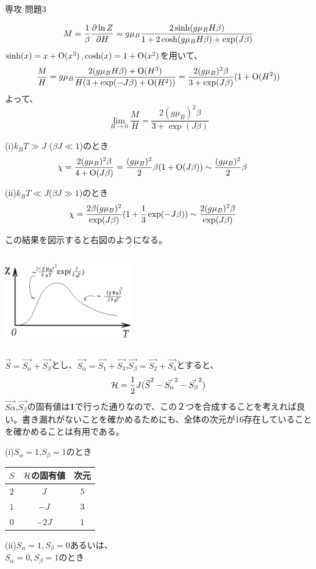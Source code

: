 \documentclass[fleqn]{jbook}
\begin{document}
\begin{answer}{専攻 問題3}{}
\begin{subanswers}
\SubAnswer
\[ M=\frac{1}{\beta}{\frac{\partial \ln Z}{\partial H}}=g\mu_B \frac{2\sinh(g\mu_B H \beta)}{1+2\cosh(g\mu_B H \beta)+\exp(J\beta)} \]
$\sinh(x)=x+{\rm{O}}(x^3)$\quad ,\quad $\cosh(x)=1+{\rm{O}}(x^2)$を用いて、
\[ \frac{M}{H}=g\mu_B \frac{2(g\mu_B H \beta)+{\rm{O}}(H^3)}{H(3+\exp(-J\beta)+{\rm{O}}(H^2))}= \frac{2 (g\mu_B)^2 \beta }{3+\exp(J\beta)}(1+{\rm{O}}(H^2)) \]
よって、
\[ \lim_{H\rightarrow 0} \frac{M}{H}= \frac{2(g\mu_B)^2 \beta }{3+\exp(J\beta)} \]
\parbox[t]{90mm}{(i)$k_B T \gg J$ ($\beta J \ll 1$)のとき
\[\hspace{-5mm} \chi=\frac{2(g\mu_B)^2 \beta}{4+{\rm{O}}(J\beta)}= \frac{(g\mu_B)^2}{2}\beta (1+{\rm{O}}(J\beta)) \sim \frac{(g\mu_B)^2}{2}\beta \]

(ii)$k_B T \ll J $($\beta J \gg 1$)のとき
\[\hspace{-5mm} \chi = \frac{2\beta(g\mu_B)^2}{\exp(J\beta)}(1+\frac{1}{3}\exp(-J\beta)) \sim \frac{2(g\mu_B)^2 \beta}{\exp(J\beta)} \]

この結果を図示すると右図のようになる。
}\parbox[t]{70mm}{\vspace*{-7mm}
\begin{center}
\includegraphics[clip,height=40mm,width=55mm]{1997phy3-3.eps}
\end{center}
}

\SubAnswer
$\vec{S}=\vec{S_\alpha}+\vec{S_\beta}$とし、$\vec{S_\alpha}=\vec{S_1}+\vec{S_3}$\quad ,\quad $\vec{S_\beta}=\vec{S_2}+\vec{S_4}$とすると、
\[ {\cal{H}}=\frac{1}{2}J (\vec{S_{ }}^2 -\vec{S_\alpha}^2-\vec{S_\beta}^2 ) \]
$\vec{S\alpha}$,$\vec{S_\beta}$の固有値は{\bf{1}}で行った通りなので、この２つを合成することを考えれば良い。書き漏れがないことを確かめるためにも、全体の次元が16存在していることを確かめることは有用である。

\parbox[t]{50mm}{
(i)$S_\alpha=1$,$S_\beta=1$のとき

\begin{tabular}{|c|c|c|}\hline
$S$ & $\cal{H}$の固有値 & 次元 \\ \hline\hline
$2$ & $J$                 & $ 5 $ \\ \hline
$1$ & $-J$                & $ 3 $ \\ \hline
$0$ & $-2J$               & $ 1 $ \\ \hline
\end{tabular}}
\parbox[t]{50mm}{
(ii)$S_\alpha=1,S_\beta=0$あるいは、\\
$S_\alpha=0,S_\beta=1$のとき

}
\end{subanswers}
\end{answer}
\end{document}
